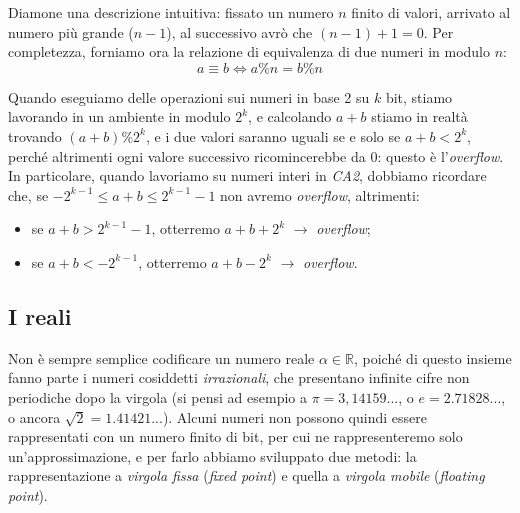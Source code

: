 \documentclass[class=book, crop=false, oneside]{standalone}
\begin{document}
Diamone una descrizione intuitiva: fissato un numero \(n\) finito di valori, arrivato al numero più grande (\(n-1\)), al successivo avrò che \((n-1)+1=0\). Per completezza, forniamo ora la relazione di equivalenza di due numeri in modulo \(n\):
\begin{equation*}
	a\equiv b \Longleftrightarrow a\%n=b\%n
\end{equation*}

Quando eseguiamo delle operazioni sui numeri in base 2 su \(k\) bit, stiamo lavorando in un ambiente in modulo \(2^{k}\), e calcolando \(a+b\) stiamo in realtà trovando \((a+b)\%2^{k}\), e i due valori saranno uguali se e solo se \(a+b<2^{k}\), perché altrimenti ogni valore successivo ricomincerebbe da 0: questo è l'\emph{overflow}. In particolare, quando lavoriamo su numeri interi in \emph{CA2}, dobbiamo ricordare che, se \(-2^{k-1}\le a+b\le 2^{k-1}-1\) non avremo \emph{overflow}, altrimenti:
\begin{itemize}
	\item se \(a+b>2^{k-1}-1\), otterremo \(a+b+2^{k}\) \(\longrightarrow\) \emph{overflow};
	\item se \(a+b<-2^{k-1}\), otterremo \(a+b-2^{k}\) \(\longrightarrow\) \emph{overflow}.
\end{itemize}

\subsection{I reali}
Non è sempre semplice codificare un numero reale \(\alpha \in \mathbb{R}\), poiché di questo insieme fanno parte i numeri cosiddetti \emph{irrazionali}, che presentano infinite cifre non periodiche dopo la virgola (si pensi ad esempio a \(\pi=3,14159...\), o \(e=2.71828...\), o ancora \(\sqrt{2}=1.41421...\)). Alcuni numeri non possono quindi essere rappresentati con un numero finito di bit, per cui ne rappresenteremo solo un'approssimazione, e per farlo abbiamo sviluppato due metodi: la rappresentazione a \emph{virgola fissa} (\emph{fixed point}) e quella a \emph{virgola mobile} (\emph{floating point}).
\end{document}
